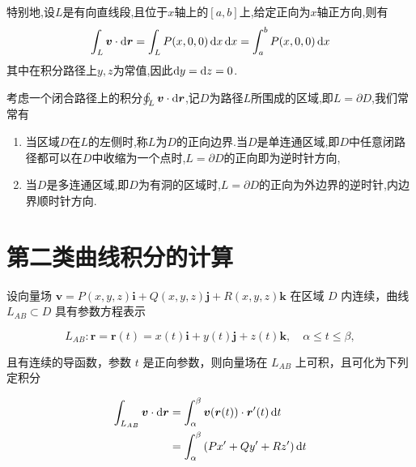 特别地,设$L$是有向直线段,且位于$x$轴上的$[a,b]$上,给定正向为$x$轴正方向,则有
$$\int_L \bm{v} \cdot \operatorname{d\!} \bm{r} = \int_L P(x,0,0) \operatorname{d\!} x \operatorname{d\!} x = \int_a^b P(x,0,0) \operatorname{d\!} x$$
其中在积分路径上$y,z$为常值,因此$\operatorname{d\!} y = \operatorname{d\!} z = 0$.

考虑一个闭合路径上的积分$\oint_L \bm{v} \cdot \operatorname{d\!} \bm{r}$,记$D$为路径$L$所围成的区域,即$L = \partial D$,我们常常有
\begin{enumerate}
    \item 当区域$D$在$L$的左侧时,称$L$为$D$的正向边界.当$D$是单连通区域,即$D$中任意闭路径都可以在$D$中收缩为一个点时,$L = \partial D$的正向即为逆时针方向,
    \item 当$D$是多连通区域,即$D$为有洞的区域时,$L = \partial D$的正向为外边界的逆时针,内边界顺时针方向.
\end{enumerate}

\section{第二类曲线积分的计算}

设向量场 $\bm{v} = P(x,y,z)\bm{i} + Q(x,y,z)\bm{j} + R(x,y,z)\bm{k}$ 在区域 $D$ 内连续，曲线 $L_{AB} \subset D$ 具有参数方程表示

\[
L_{AB} : \bm{r} = \bm{r}(t) = x(t)\bm{i} + y(t)\bm{j} + z(t)\bm{k}, \quad \alpha \leq t \leq \beta,
\]

且有连续的导函数，参数 $t$ 是正向参数，则向量场在 $L_{AB}$ 上可积，且可化为下列定积分

\begin{align*}
    \int_{L_{AB}} \bm{v} \cdot \operatorname{d\!} \bm{r} &= \int_{\alpha}^{\beta} \bm{v}(\bm{r}(t)) \cdot \bm{r}'(t) \operatorname{d\!} t\\
    &= \int_{\alpha}^{\beta} \left( Px' + Qy' + Rz' \right) \operatorname{d\!} t
\end{align*}

